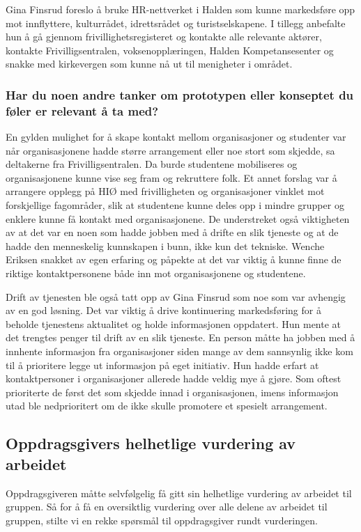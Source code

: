 Gina Finsrud foreslo å bruke HR-nettverket i Halden som kunne markedsføre opp mot innflyttere, kulturrådet, idrettsrådet og turistselskapene. I tillegg anbefalte hun å gå gjennom frivillighetsregisteret og kontakte alle relevante aktører, kontakte Frivilligsentralen, voksenopplæringen, Halden Kompetansesenter og snakke med kirkevergen som kunne nå ut til menigheter i området. \cite{KOMMUNEN-INTERVJU:20}

\subsubsection{Har du noen andre tanker om prototypen eller konseptet du føler er relevant å ta med?}
En gylden mulighet for å skape kontakt mellom organisasjoner og studenter var når organisasjonene hadde større arrangement eller noe stort som skjedde, sa deltakerne fra Frivilligsentralen. Da burde studentene mobiliseres og organisasjonene kunne vise seg fram og rekruttere folk. Et annet forslag var å arrangere opplegg på HIØ med frivilligheten og organisasjoner vinklet mot forskjellige fagområder, slik at studentene kunne deles opp i mindre grupper og enklere kunne få kontakt med organisasjonene. De understreket også viktigheten av at det var en noen som hadde jobben med å drifte en slik tjeneste og at de hadde den menneskelig kunnskapen i bunn, ikke kun det tekniske. Wenche Eriksen snakket av egen erfaring og påpekte at det var viktig å kunne finne de riktige kontaktpersonene både inn mot organisasjonene og studentene. \cite{FRIVILLIGSENTRALEN-INTERVJU:21}

Drift av tjenesten ble også tatt opp av Gina Finsrud som noe som var avhengig av en god løsning. Det var viktig å drive kontinuering markedsføring for å beholde tjenestens aktualitet og holde informasjonen oppdatert. Hun mente at det trengtes penger til drift av en slik tjeneste. En person måtte ha jobben med å innhente informasjon fra organisasjoner siden mange av dem sannsynlig ikke kom til å prioritere legge ut informasjon på eget initiativ. Hun hadde erfart at kontaktpersoner i organisasjoner allerede hadde veldig mye å gjøre. Som oftest prioriterte de først det som skjedde innad i organisasjonen, imens informasjon utad ble nedprioritert om de ikke skulle promotere et spesielt arrangement. \cite{KOMMUNEN-INTERVJU:20}

\subsection{Oppdragsgivers helhetlige vurdering av arbeidet}
Oppdragsgiveren måtte selvfølgelig få gitt sin helhetlige vurdering av arbeidet til gruppen. Så for å få en oversiktlig vurdering over alle delene av arbeidet til gruppen, stilte vi en rekke spørsmål til oppdragsgiver rundt vurderingen. 

